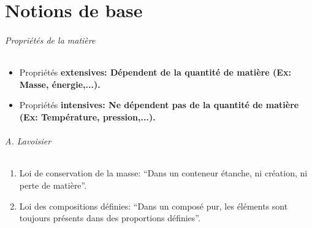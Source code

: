

\usepackage{multirow}
\usepackage[version=3]{mhchem}
\usepackage[squaren, Gray]{SIunits}
\usepackage{color}
\usepackage{chemfig}
\usepackage{numprint}
\usepackage{appendix}
\usepackage{tikz}
\usepackage{pgfplots}
\usepackage{pgffor}

\renewcommand{\textbf}[1]{\begingroup\bfseries\mathversion{bold}#1\endgroup}

\newcommand\sorb{\mathrm{s}}
\newcommand\porb{\mathrm{p}}
\newcommand\dorb{\mathrm{d}}
\newcommand\forb{\mathrm{f}}
\newcommand\gorb{\mathrm{g}}
\newcommand\gaz{\ensuremath{_{(g)}}}
\newcommand\solid{\ensuremath{_{(s)}}}
\newcommand\liquid{\ensuremath{_{(l)}}}
\newcommand\debye{\mathrm{D}}
\newcommand\calo{\mathrm{cal}}
\newcommand\atm{\mathrm{atm}}
\newcommand\ccal{\ensuremath{C_\mathrm{cal}}}
\newcommand\qrev{\ensuremath{q_{\mathrm{rév}}}}
\newcommand\kc{\ensuremath{K_{\mathrm{c}}}}
\newcommand\kp{\ensuremath{K_{\mathrm{p}}}}
\newcommand\keq{\ensuremath{K_{\mathrm{éq}}}}
\newcommand\eqdef{\stackrel{\Delta}{=}}
\newcommand\pkb{\mathrm{p}\ensuremath{K_b}}
\newcommand\pka{\mathrm{p}\ensuremath{K_a}}
\newcommand\ph{\ensuremath{\mathrm{pH}}}



\maketitle

\part{Notions de base}

\paragraph{Propriétés de la matière}
\begin{itemize}
	\item Propriétés \textbf{extensives}: Dépendent de la quantité de matière (Ex: Masse, énergie,...).
	\item Propriétés \textbf{intensives}: Ne dépendent pas de la quantité de matière (Ex: Température, pression,...).
\end{itemize}

\paragraph{A. Lavoisier}
\begin{enumerate}
	\item Loi de conservation de la masse: ``Dans un conteneur étanche, ni création, ni perte de matière''.
	\item Loi des compositions définies: ``Dans un composé pur, les éléments sont toujours présents dans des proportions définies''.
\end{enumerate}

